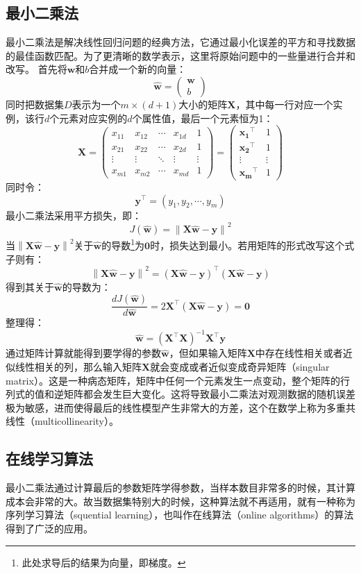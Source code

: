 \documentclass[12pt,a4paper,draft]{ctexart}
\begin{document}
\subsection{最小二乘法}
最小二乘法是解决线性回归问题的经典方法，它通过最小化误差的平方和寻找数据的最佳函数匹配。为了更清晰的数学表示，这里将原始问题中的一些量进行合并和改写。
首先将$ \bm{w} $和$ b $合并成一个新的向量：
\[ \hat{\bm{w}}=\begin{pmatrix}
\bm{w} \\ 
b
\end{pmatrix}  \]
同时把数据集$ D $表示为一个$ m\times(d+1) $大小的矩阵$ \bm{X} $，其中每一行对应一个实例，该行$ d $个元素对应实例的$ d $个属性值，最后一个元素恒为1：
\[ 
\bm{X}=
\begin{pmatrix}
	x_{11} & x_{12} & \cdots & x_{1d} & 1 \\ 
	x_{21} & x_{22} & \cdots & x_{2d} & 1 \\ 
	\vdots & \vdots & \ddots & \vdots & \vdots \\ 
	x_{m1} & x_{m2} & \cdots & x_{md} & 1
\end{pmatrix} =\begin{pmatrix}
\bm{x_1}^\top & 1 \\ 
\bm{x_2}^\top & 1 \\ 
\vdots & \vdots \\ 
\bm{x_m}^\top & 1
\end{pmatrix} 
\]
同时令：
\[ \bm{y}^\top=(y_1,y_2,\cdots,y_m) \]
最小二乘法采用平方损失，即： 
\[ J(\bm{\hat{w}})=\left \| \bm{X}\bm{\hat{w}}-\bm{y} \right \|^{2} \]
当$ \left \| \bm{X}\bm{\hat{w}}-\bm{y} \right \|^{2} $关于$ \hat{\bm{w}} $的导数\footnote{此处求导后的结果为向量，即梯度。}为$ \bm{0} $时，损失达到最小。若用矩阵的形式改写这个式子则有： 
\[ \left \| \bm{X}\bm{\hat{w}}-\bm{y} \right \|^{2}=(\bm{X}\bm{\hat{w}}-\bm{y})^\top(\bm{X}\bm{\hat{w}}-\bm{y}) \]
得到其关于$ \bm{\hat{w}} $的导数为： 
\[ \frac{dJ(\bm{\hat{w}})}{d\bm{\hat{w}}}=2\bm{X}^\top(\bm{X}\hat{\bm{w}}-\bm{y})=\bm{0} \]
整理得： 
\[ \hat{\bm{w}}=(\bm{X}^\top\bm{X})^{-1}\bm{X}^\top\bm{y} \]
通过矩阵计算就能得到要学得的参数$ \bm{\hat{w}} $，但如果输入矩阵$ \bm{X} $中存在线性相关或者近似线性相关的列，那么输入矩阵$ \bm{X} $就会变成或者近似变成奇异矩阵（singular matrix）。这是一种病态矩阵，矩阵中任何一个元素发生一点变动，整个矩阵的行列式的值和逆矩阵都会发生巨大变化。这将导致最小二乘法对观测数据的随机误差极为敏感，进而使得最后的线性模型产生非常大的方差，这个在数学上称为多重共线性（multicollinearity）。
\subsection{在线学习算法}
最小二乘法通过计算最后的参数矩阵学得参数，当样本数目非常多的时候，其计算成本会非常的大。故当数据集特别大的时候，这种算法就不再适用，就有一种称为序列学习算法（squential learning），也叫作在线算法（online algorithms）的算法得到了广泛的应用。
\end{document}
